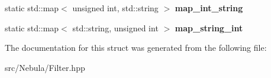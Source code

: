 \begin{DoxyCompactItemize}
\item 
\hypertarget{structNeb_1_1Filter_1_1Filter_afd357998a65a640858d9b9d1f8e729d5}{static std\-::map$<$ unsigned int, \*
std\-::string $>$ {\bfseries map\-\_\-int\-\_\-string}}\label{structNeb_1_1Filter_1_1Filter_afd357998a65a640858d9b9d1f8e729d5}

\item 
\hypertarget{structNeb_1_1Filter_1_1Filter_ac43b100f5e97bcf435218cec70f0ebba}{static std\-::map$<$ std\-::string, \*
unsigned int $>$ {\bfseries map\-\_\-string\-\_\-int}}\label{structNeb_1_1Filter_1_1Filter_ac43b100f5e97bcf435218cec70f0ebba}

\end{DoxyCompactItemize}


\-The documentation for this struct was generated from the following file\-:\begin{DoxyCompactItemize}
\item 
src/\-Nebula/\-Filter.\-hpp\end{DoxyCompactItemize}
